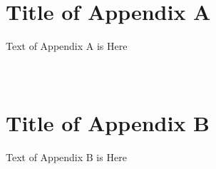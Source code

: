 \appendix
\section{\\Title of Appendix A}

Text of Appendix A is Here

\section{\\Title of Appendix B}

Text of Appendix B is Here
